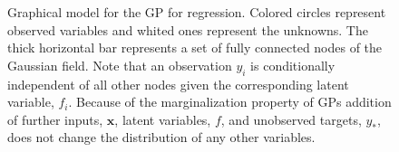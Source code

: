\begin{figure}
\begin{center}
\begin{tikzpicture}
          \end{tikzpicture}
    \end{center}
    \caption{Graphical model for the GP for regression. Colored circles represent observed variables and whited ones represent the unknowns. The thick horizontal bar represents a set of fully connected nodes of the Gaussian field. Note that an observation $y_i$ is conditionally independent of all other nodes given the corresponding latent variable, $f_i$. Because of the marginalization property of GPs addition of further inputs, $\mathbf{x}$, latent variables, $f$, and unobserved targets, $y_*$, does not change the distribution of any other variables.}
\end{figure}